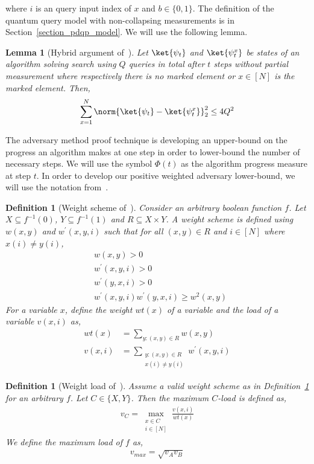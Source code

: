 \documentclass[10pt,a4paper]{article}
\newtheorem{lemma}[theorem]{Lemma}
\newtheorem{definition}[theorem]{Definition}
\begin{document}
where $i$ is an query input index of $x$ and $b\in \{0,1\}$. The definition of the quantum query model with non-collapsing measurements is in Section~\ref{section_pdqp_model}. We will use the following lemma.

\begin{lemma}[Hybrid argument of~\cite{bbbv_97}]\label{lemma_hybrid_argument} Let $\ket{\psi_t}$ and $\ket{\psi_t^x}$ be states of an algorithm solving search using $Q$ queries in total after $t$ steps without partial measurement where respectively there is no marked element or $x\in [N]$ is the marked element. Then,
\begin{align*}
    \sum_{x=1}^{N} \norm{\ket{\psi_t} - \ket{\psi_t^x}}_2^2 \leq 4Q^2
\end{align*}
\end{lemma}

The adversary method proof technique is developing an upper-bound on the progress an algorithm makes at one step in order to lower-bound the number of necessary steps. We will use the symbol $\Phi(t)$ as the algorithm progress measure at step $t$. In order to develop our positive weighted adversary lower-bound, we will use the notation from~\cite{weighted_adversary}.

\begin{definition}[Weight scheme of~\cite{weighted_adversary}]\label{definition_weight_scheme}
    Consider an arbitrary boolean function $f$. Let $X\subseteq f^{-1}(0)$, $Y\subseteq f^{-1}(1)$ and $R\subseteq X\times Y$. A weight scheme is defined using $w(x,y)$ and $w^\prime(x,y,i)$ such that for all $(x,y)\in R$ and $i\in [N]$ where $x(i)\neq y(i)$,
    \begin{align*}
        &w(x,y)>0 \\
         &w^\prime(x,y,i)>0 \\
         &w^\prime (y,x,i)>0 \\
         &w^\prime(x,y,i)w^\prime (y,x,i)\geq w^2(x,y)
    \end{align*}
    For a variable $x$, define the weight $wt(x)$ of a variable and the load of a variable $v(x,i)$ as,
    \begin{align*}
        wt(x)&=\sum_{y: (x,y)\in R} w(x,y)\\
        v(x,i) &= \sum_{\substack{y: (x,y)\in R \\ x(i)\neq y(i)}} w^\prime (x,y,i)
    \end{align*}
\end{definition}

\begin{definition}[Weight load of~\cite{weighted_adversary}]\label{definition_weight_load}
    Assume a valid weight scheme as in Definition~\ref{definition_weight_scheme} for an arbitrary $f$. Let $C\in\{X,Y\}$. Then the maximum  $C$-load is defined as,
    \begin{align*}
        v_C = \max_{\substack{x\in C \\ i\in [N]}} \frac{v(x,i)}{wt(x)}
    \end{align*}
    We define the maximum load of $f$ as,
    \begin{align*}
        v_{max} = \sqrt{v_A v_B}
    \end{align*}
\end{definition}
\end{document}
